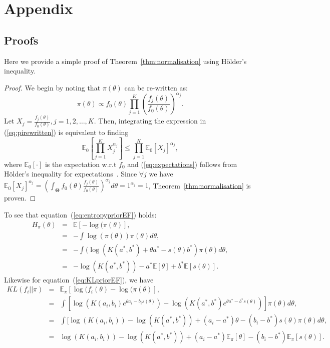 \documentclass[a4paper, notitlepage, 10pt]{article}
\begin{document}
\newpage 

\appendix
\section{Appendix}
\renewcommand\thefigure{S\arabic{figure}}    
\setcounter{figure}{0} 

\subsection{Proofs}

Here we provide a simple proof of Theorem~\ref{thm:normalisation} using H\"{o}lder's inequality.
\begin{proof}
We begin by noting that $\pi(\theta)$ can be re-written as:
\begin{equation}
\label{eq:pirewritten}
 \pi(\theta) \propto f_0(\theta)\prod_{j=1}^{K} \left(\frac{f_j(\theta)}{f_0(\theta)}\right)^{\alpha_j}.
\end{equation}
Let $X_j = \frac{f_j(\theta)}{f_0(\theta)}, j=1, 2,\ldots, K$. 
Then, integrating the expression in (\ref{eq:pirewritten}) is equivalent to finding 
\begin{equation}
\label{eq:expectations}
\mathbb{E}_{0}\left[\prod_{j=1}^KX_j^{\alpha_j}\right] \leq \prod_{j=1}^K \mathbb{E}_{0}[X_j]^{\alpha_j},
\end{equation}
where $\mathbb{E}_{0}[\cdot]$ is the expectation w.r.t $f_0$ and (\ref{eq:expectations}) follows from H\"{o}lder's inequality for expectations~\citep{yeh2011}.
Since $\forall j$ we have $\mathbb{E}_{0}[X_j]^{\alpha_j} = \left(\int_{\boldsymbol\Theta}f_0(\theta)\frac{f_j(\theta)}{f_0(\theta)}\right)^{\alpha_j}d\theta=1^{\alpha_j}=1$, Theorem~\ref{thm:normalisation} is proven.
\end{proof}


To see that equation~(\ref{eq:entropypriorEF}) holds:
\begin{eqnarray*} 
H_\pi(\theta) & = & \mathbb{E}[-\log(\pi(\theta)], \\
              & = & - \int \log(\pi(\theta)) \pi(\theta) d\theta, \\
              & = & - \int (\log(K(a^*, b^*) + \theta a^* - s(\theta) b^*) \pi(\theta) d\theta, \\
              & = & - \log(K(a^*, b^*)) - a^*  \mathbb{E}[\theta] +  b^*  \mathbb{E}[s(\theta)].
\end{eqnarray*}
Likewise for equation~(\ref{eq:KLpriorEF}), we have 
\begin{eqnarray*} 
KL(f_i || \pi) & = & \mathbb{E}_\pi[\log(f_i(\theta)-\log(\pi(\theta)], \\
              & = & \int [\log( K(a_i,b_i) e^{\theta a_i - b_i s(\theta)}) - \log(K(a^*,b^*) e^{\theta a^* - b^* s(\theta)}) ] \pi(\theta) d\theta, \\
              & = & \int [\log( K(a_i,b_i)) - \log(K(a^*,b^*)) + (a_i - a^*) \theta  - (b_i - b^*) s(\theta) \pi(\theta) d\theta, \\
              & = & \log( K(a_i,b_i)) - \log(K(a^*,b^*)) + (a_i - a^*) \mathbb{E}_\pi[\theta] - (b_i - b^*) \mathbb{E}_\pi[s(\theta)]. 
\end{eqnarray*}
\end{document}
